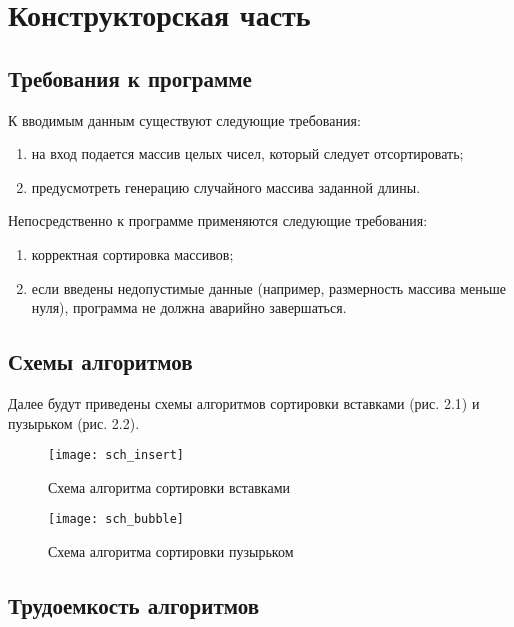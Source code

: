 \chapter{Конструкторская часть}

\section{Требования к программе}

К вводимым данным существуют следующие требования:
\begin{enumerate}
	\item на вход подается массив целых чисел, который следует отсортировать;
	\item предусмотреть генерацию случайного массива заданной длины.
\end{enumerate}


Непосредственно к программе применяются следующие требования:
\begin{enumerate}
	\item корректная сортировка массивов;
	\item если введены недопустимые данные (например, размерность массива меньше нуля), программа не должна аварийно завершаться.
\end{enumerate}




\section{Схемы алгоритмов}

Далее будут приведены схемы алгоритмов сортировки вставками (рис. 2.1) и пузырьком (рис. 2.2).
\newpage

\begin{figure}[!htbp]
\centering
\texttt{[image: sch\_insert]}
\caption{Схема алгоритма сортировки вставками}
\label{fig:mpr}
\end{figure}

\begin{figure}[!htbp]
\centering
\texttt{[image: sch\_bubble]}
\caption{Схема алгоритма сортировки пузырьком}
\label{fig:mpr}
\end{figure}





\section{Трудоемкость алгоритмов}

